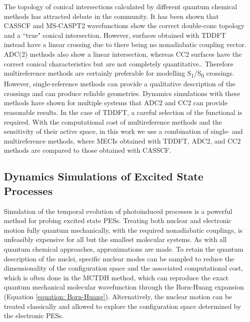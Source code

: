 The topology of conical intersections calculated by different quantum chemical methods has attracted debate in the community.\cite{Levine2006a,Gozem2014,Tuna2015,Lefrancois2017}  It has been shown that CASSCF and MS-CASPT2 wavefunctions show the correct double-cone topology and a ``true" conical intersection. However, surfaces obtained with \ac{TDDFT} instead have a linear crossing due to there being no nonadiabatic coupling vector.\cite{Gozem2014} ADC(2) methods also show a linear intersection, whereas \ac{CC}2 surfaces have the correct conical characteristics but are not completely quantitative.\cite{Tuna2015}. Therefore multireference methods are certainly preferable for modelling S\textsubscript{1}/S\textsubscript{0} crossings. However, single-reference methods can provide a qualitative description of the crossings and can produce reliable geometries. Dynamics simulations with these methods have shown for multiple systems that ADC2 and CC2 can provide reasonable results.\cite{Gozem2014,Tuna2015} In the case of TDDFT, a careful selection of the functional is required.\cite{Crespo-Otero2014,Barbatti2015} With the computational cost of multireference methods and the sensitivity of their active space, in this work we use a combination of single- and multireference methods, where \acp{MECI} obtained with \ac{TDDFT}, \ac{ADC2}, and \ac{CC}2 methods are compared to those obtained with CASSCF.

\subsection{Dynamics Simulations of Excited State Processes}\label{section: photo_dynamics}
Simulation of the temporal evolution of photoinduced processes is a powerful method for probing excited state \acp{PES}. Treating both nuclear and electronic motion fully quantum mechanically, with the required nonadiabatic couplings, is unfeasibly expensive for all but the smallest molecular systems. As with all quantum chemical approaches, approximations are made. To retain the quantum description of the nuclei, specific nuclear modes can be sampled to reduce the dimensionality of the configuration space and the associated computational cost, which is often done in the \ac{MCTDH} method, which can reproduce the exact quantum mechanical molecular wavefunction through the Born-Huang expansion (Equation \ref{equation: Born-Huang}).\cite{Worth2004} Alternatively, the nuclear motion can be treated classically and allowed to explore the configuration space determined by the electronic \acp{PES}. 

